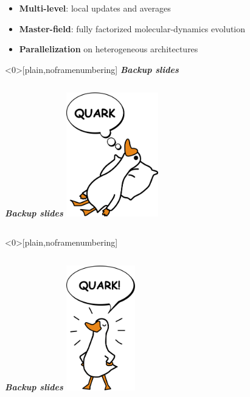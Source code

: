 \documentclass[11pt,aspectratio=43]{beamer}
\begin{document}
\begin{frame}{}
\begin{itemize}
    \item \textbf{Multi-level}: local updates and averages \vspace{\baselineskip}
    \item \textbf{Master-field}: fully factorized molecular-dynamics evolution \vspace{\baselineskip}
    \item \textbf{Parallelization} on heterogeneous architectures \vspace{\baselineskip}
\end{itemize}
\end{frame}

%

\begin{frame}<0>[plain,noframenumbering]
\centering \textbf { \Large \color{myblue} \emph{Backup slides}}
\end{frame}

\begin{frame}
\begin{columns}
\centering \textbf { \Large \color{myblue} \emph{Backup slides}}
\centering \includegraphics[width=4cm]{DUCK_1}
\end{columns}
\end{frame}

\begin{frame}<0>[plain,noframenumbering]
\begin{columns}
\centering \textbf { \Large \color{myblue} \emph{Backup slides}}
\centering \includegraphics[width=3cm]{DUCK_2}
\end{columns}
\end{frame}
\end{document}
